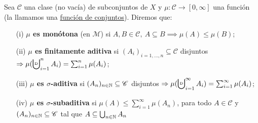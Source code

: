 	\begin{definition}
		Sea $\mathscr{C}$ una clase (no vacía) de subconjuntos de $X$ y $\mu : \mathscr{C} \to [0,\infty]$ una función (la llamamos una \underline{función de conjuntos}). Diremos que:
		\begin{enumerate}
			\item[(i)] \textbf{$\mu$ es monótona} (en $\mathscr{M}$) si $A,B\in\mathscr{C},\ A \subseteq B \implies \mu(A)\leq\mu(B)$;

			\item[(ii)] \textbf{$\mu$ es finitamente aditiva} si $(A_i)_{i=1,\dots,n} \subseteq \mathscr{C}$ disjuntos $\implies \mu(\bigcupd_{i=1}^{n} A_i) = \sum_{i=1}^{n} \mu(A_i)$;

			\item[(iii)] \textbf{$\mu$ es $\sigma$-aditiva} si $(A_n)_{n\in\mathbb{N}} \subseteq \mathscr{C}$ disjuntos $\implies \mu (\bigcupd_{i=1}^{\infty} A_i ) = \sum_{i=1}^{\infty} \mu(A_i)$;

			\item[(iv)] \textbf{$\mu$ es $\sigma$-subaditiva} si $\mu(A)\leq \sum_{i=1}^{\infty}\mu(A_n)$, para todo $A \in \mathscr{C}$ y $(A_n)_{n\in\mathbb{N}}\subseteq\mathscr{C}$ tal que $A \subseteq \bigcup_{n\in\mathbb{N}} A_n$
		\end{enumerate}
	\end{definition}

